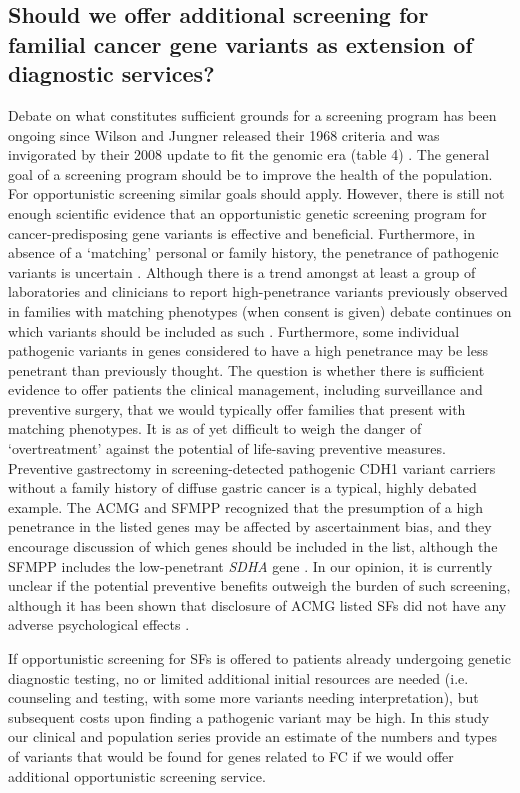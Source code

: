 \subsection{Should we offer additional screening for familial cancer gene variants as extension of diagnostic services?}
Debate on what constitutes sufficient grounds for a screening program has been ongoing since Wilson and Jungner released their 1968 criteria and was invigorated by their 2008 update to fit the genomic era (table 4) \cite{Andermann_2008}. %
The general goal of a screening program should be to improve the health of the population. For opportunistic screening similar goals should apply. 
However, there is still not enough scientific evidence that an opportunistic genetic screening program for cancer-predisposing gene variants is effective and beneficial. Furthermore, in absence of a ‘matching’ personal or family history, the penetrance of pathogenic variants is uncertain \cite{Brothers_2019}. 
Although there is a trend amongst at least a group of laboratories and clinicians to report high-penetrance variants previously observed in families with matching phenotypes (when consent is given) debate continues on which variants should be included as such \cite{Pujol_2018,Shkedi_Rafid_2014,Braverman_2018}. 
Furthermore, some individual pathogenic variants in genes considered to have a high penetrance may be less penetrant than previously thought. 
The question is whether there is sufficient evidence to offer patients the clinical management, including surveillance and preventive surgery, that we would typically offer families that present with matching phenotypes. It is as of yet difficult to weigh the danger of ‘overtreatment’ against the potential of life-saving preventive measures. 
Preventive gastrectomy in screening-detected pathogenic CDH1 variant carriers without a family history of diffuse gastric cancer is a typical, highly debated example. 
The ACMG and SFMPP recognized that the presumption of a high penetrance in the listed genes may be affected by ascertainment bias, and they encourage discussion of which genes should be included in the list, although the SFMPP includes the low-penetrant \textsl{SDHA} gene \cite{Kalia_2016,Pujol_2018}. 
In our opinion, it is currently unclear if the potential preventive benefits outweigh the burden of such screening, although it has been shown that disclosure of ACMG listed SFs did not have any adverse psychological effects \cite{Olfson_2015}. 

If opportunistic screening for SFs is offered to patients already undergoing genetic diagnostic testing, no or limited additional initial resources are needed (i.e. counseling and testing, with  some more variants needing interpretation), but subsequent costs upon finding a pathogenic variant may be high. 
In this study our clinical and population series provide an estimate of the numbers and types of variants that would be found for genes related to FC if we would offer additional opportunistic screening service. 

